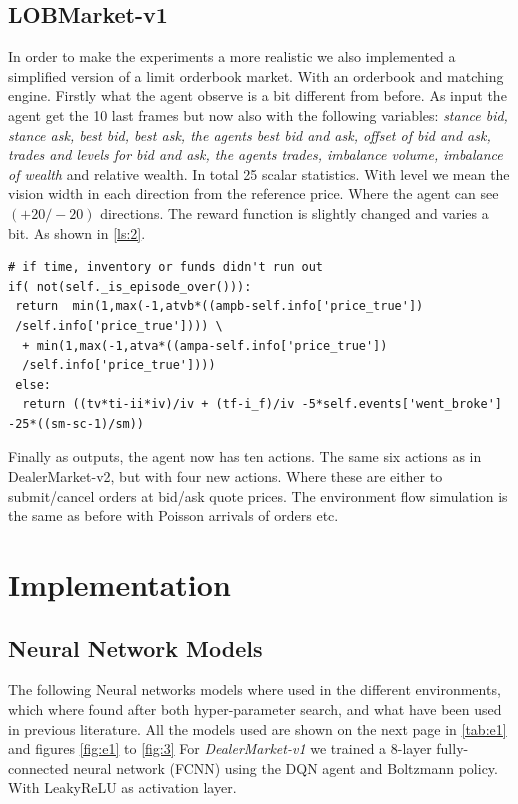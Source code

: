 \documentclass{kththesis}
\theoremstyle{definition}
\begin{document}
\subsection{LOBMarket-v1}
In order to make the experiments a more realistic we also implemented a simplified version of a limit orderbook market. With an orderbook and matching engine. Firstly what the agent observe is a bit different from before. As input the agent get the 10 last frames but now also with the following variables: \textit{stance bid, stance ask, best bid, best ask, the agents best bid and ask, offset of bid and ask,  trades and levels for bid and ask, the agents trades, imbalance volume, imbalance of wealth} and relative wealth. In total 25 scalar statistics. With level we mean the vision width in each direction from the reference price. Where the agent can see $(+20/-20)$ directions. The reward function is slightly changed and varies a bit. As shown in \autoref{ls:2}.

\begin{lstlisting}[caption={Reward function for LOBMarket-v1},captionpos=b, label=ls:2]
# if time, inventory or funds didn't run out
if( not(self._is_episode_over())):
 return  min(1,max(-1,atvb*((ampb-self.info['price_true'])
 /self.info['price_true']))) \
  + min(1,max(-1,atva*((ampa-self.info['price_true'])
  /self.info['price_true']))) 
 else: 
  return ((tv*ti-ii*iv)/iv + (tf-i_f)/iv -5*self.events['went_broke'] -25*((sm-sc-1)/sm))
\end{lstlisting}
Finally as outputs, the agent now has ten actions. The same six actions as in DealerMarket-v2, but with four new actions. Where these are either to submit/cancel orders at bid/ask quote prices. The environment flow simulation is the same as before with Poisson arrivals of orders etc.

\section{Implementation}


\subsection{Neural Network Models}
The following Neural networks models where used in the different environments, which where found after both hyper-parameter search, and what have been used in previous literature. All the models used are shown on the next page in \autoref{tab:e1} and figures \autoref{fig:e1} to \autoref{fig:3} For \textit{DealerMarket-v1} we trained a 8-layer fully-connected neural network (FCNN) using the DQN agent and Boltzmann policy. With LeakyReLU as activation layer.
\end{document}

